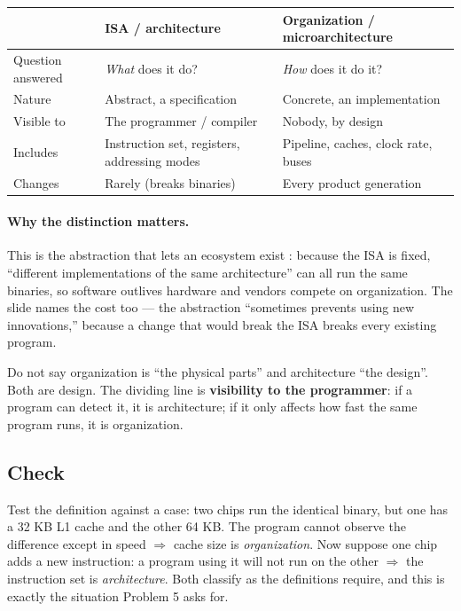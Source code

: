 \begin{center}
\begin{tabular}{@{}l>{\raggedright\arraybackslash}p{5.1cm}>{\raggedright\arraybackslash}p{5.1cm}@{}}
  \toprule
  & \textbf{ISA / architecture} & \textbf{Organization / microarchitecture} \\
  \midrule
  Question answered & \emph{What} does it do? & \emph{How} does it do it? \\
  Nature            & Abstract, a specification & Concrete, an implementation \\
  Visible to        & The programmer / compiler & Nobody, by design \\
  Includes          & Instruction set, registers, addressing modes & Pipeline, caches, clock rate, buses \\
  Changes           & Rarely (breaks binaries) & Every product generation \\
  \bottomrule
\end{tabular}
\end{center}

\paragraph{Why the distinction matters.}
This is the abstraction that lets an ecosystem exist :
because the ISA is fixed, ``different implementations of the same architecture''
can all run the same binaries, so software outlives hardware and vendors compete
on organization. The slide names the cost too — the abstraction ``sometimes
prevents using new innovations,'' because a change that would break the ISA
breaks every existing program.

\begin{trap}
Do not say organization is ``the physical parts'' and architecture ``the
design''. Both are design. The dividing line is \textbf{visibility to the
programmer}: if a program can detect it, it is architecture; if it only affects
how fast the same program runs, it is organization.
\end{trap}

\subsection*{Check}

Test the definition against a case: two chips run the identical binary, but one
has a 32 KB L1 cache and the other 64 KB. The program cannot observe the
difference except in speed $\Rightarrow$ cache size is \emph{organization}. Now
suppose one chip adds a new instruction: a program using it will not run on the
other $\Rightarrow$ the instruction set is \emph{architecture}. Both classify as
the definitions require, and this is exactly the situation Problem 5 asks for.

